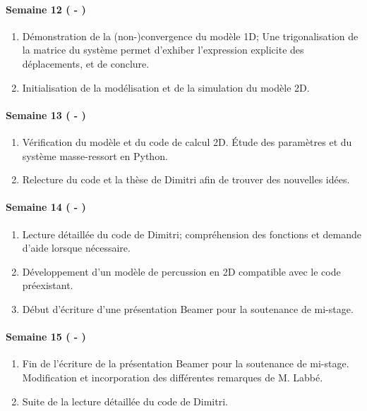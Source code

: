 \paragraph{Semaine 12 ( - )} 
\begin{enumerate}
    \item Démonstration de la (non-)convergence du modèle 1D; 
    Une trigonalisation de la matrice du système permet d'exhiber l'expression explicite des déplacements, et de conclure.
    \item Initialisation de la modélisation et de la simulation du modèle 2D.
  \end{enumerate}
  
\paragraph{Semaine 13 ( - )} 
\begin{enumerate}
    \item Vérification du modèle et du code de calcul 2D. Étude des paramètres et du système masse-ressort en Python.
    \item Relecture du code et la thèse de Dimitri afin de trouver des nouvelles idées.
\end{enumerate}


\paragraph{Semaine 14 ( - )} 
\begin{enumerate}
    \item Lecture détaillée du code de Dimitri; compréhension des fonctions et demande d'aide lorsque nécessaire.
    \item Développement d'un modèle de percussion en 2D compatible avec le code préexistant.
    \item Début d'écriture d'une présentation Beamer pour la soutenance de mi-stage.
\end{enumerate}
  

\paragraph{Semaine 15 ( - )} 
\begin{enumerate}
    \item Fin de l'écriture de la présentation Beamer pour la soutenance de mi-stage. Modification et incorporation des différentes remarques de M. Labbé. 
    \item Suite de la lecture détaillée du code de Dimitri.
  \end{enumerate}



